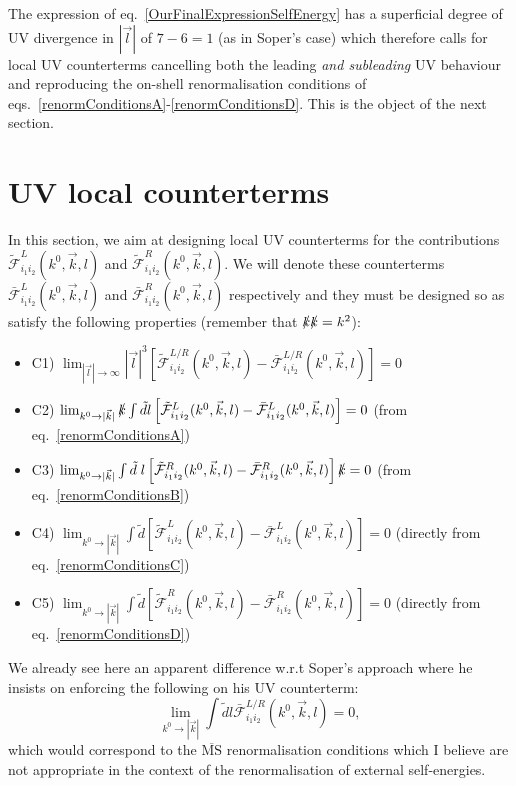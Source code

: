 \documentclass[11pt]{article}
\begin{document}
The expression of eq.~\ref{OurFinalExpressionSelfEnergy} has a superficial degree of UV divergence in $|\vec{l}|$ of $7-6=1$ (as in Soper's case) which therefore calls for local UV counterterms cancelling both the leading \emph{and subleading} UV behaviour and reproducing the on-shell renormalisation conditions of eqs.~\ref{renormConditionsA}-\ref{renormConditionsD}.
This is the object of the next section. 

\section{UV local counterterms}

In this section, we aim at designing local UV counterterms for the contributions $\mathcal{\tilde{F}}^{L}_{i_1i_2}(k^0, \vec{k},l)$ and $\mathcal{\tilde{F}}^{R}_{i_1i_2}(k^0, \vec{k},l)$.
We will denote these counterterms $\mathcal{\bar{F}}^{L}_{i_1i_2}(k^0, \vec{k},l)$ and $\mathcal{\bar{F}}^{R}_{i_1i_2}(k^0, \vec{k},l)$ respectively and they must be designed so as satisfy the following properties (remember that $\slashed{k}\slashed{k}=k^2$):
\begin{itemize}
\item C1) $\lim_{|\vec{l}|\rightarrow \infty} |\vec{l}|^3 \left[ \mathcal{\tilde{F}}^{L/R}_{i_1i_2}(k^0, \vec{k},l) - \mathcal{\bar{F}}^{L/R}_{i_1i_2}(k^0, \vec{k},l) \right] =0$
\item C2) $\lim_{k^0\rightarrow |\vec{k}|} \slashed{k} \int \tilde{d}l \left[ \mathcal{\tilde{F}}^{L}_{i_1i_2}(k^0, \vec{k},l) - \mathcal{\bar{F}}^{L}_{i_1i_2}(k^0, \vec{k},l) \right] =0$ (from eq.~\ref{renormConditionsA})
\item C3) $\lim_{k^0\rightarrow |\vec{k}|} \int \tilde{d}\;l \left[ \mathcal{\tilde{F}}^{R}_{i_1i_2}(k^0, \vec{k},l) - \mathcal{\bar{F}}^{R}_{i_1i_2}(k^0, \vec{k},l) \right] \slashed{k} =0$ (from eq.~\ref{renormConditionsB})
\item C4) $\lim_{k^0\rightarrow |\vec{k}|} \int \tilde{d} \left[ \mathcal{\tilde{F}}^{L}_{i_1i_2}(k^0, \vec{k},l) - \mathcal{\bar{F}}^{L}_{i_1i_2}(k^0, \vec{k},l) \right] =0$ (directly from eq.~\ref{renormConditionsC})
\item C5) $\lim_{k^0\rightarrow |\vec{k}|} \int \tilde{d} \left[ \mathcal{\tilde{F}}^{R}_{i_1i_2}(k^0, \vec{k},l) - \mathcal{\bar{F}}^{R}_{i_1i_2}(k^0, \vec{k},l) \right] =0$ (directly from eq.~\ref{renormConditionsD})
\end{itemize}
We already see here an apparent difference w.r.t Soper's approach where he insists on enforcing the following on his UV counterterm:
\begin{equation}
\lim_{k^0\rightarrow |\vec{k}|} \int \tilde{d}l \mathcal{\bar{F}}^{L/R}_{i_1i_2}(k^0, \vec{k},l) = 0,
\end{equation}
which would correspond to the $\overline{\textrm{MS}}$ renormalisation conditions which I believe are not appropriate in the context of the renormalisation of external self-energies.
\end{document}
